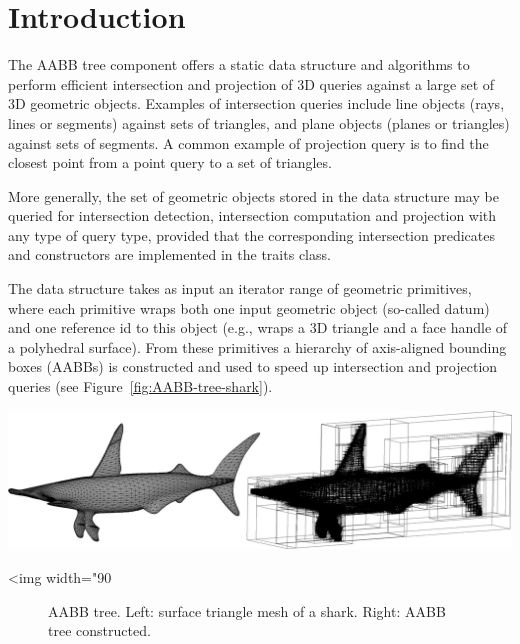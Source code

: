 \section{Introduction}
\label{AABB_tree_section_intro}

The AABB tree component offers a static data structure and algorithms to perform efficient intersection and projection of 3D queries against a large set of 3D geometric objects. Examples of intersection queries include line objects (rays, lines or segments) against sets of triangles, and plane objects (planes or triangles) against sets of segments. A common example of projection query is to find the closest point from a point query to a set of triangles.

More generally, the set of geometric objects stored in the data structure may be queried for intersection detection, intersection computation and projection with any type of query type, provided that the corresponding intersection predicates and constructors are implemented in the traits class. 

The data structure takes as input an iterator range of geometric primitives, where each primitive wraps both one input geometric object (so-called datum) and one reference id to this object (e.g., wraps a 3D triangle and a face handle of a polyhedral surface). From these primitives a hierarchy of axis-aligned bounding boxes (AABBs) is constructed and used to speed up intersection and projection queries (see Figure~\ref{fig:AABB-tree-shark}). 

\begin{center}
    \label{fig:AABB-tree-shark}
    \begin{ccTexOnly}
      \includegraphics[width=1.0\textwidth]{AABB_tree/shark}
    \end{ccTexOnly}
    \begin{ccHtmlOnly}
        <img width="90%
    \end{ccHtmlOnly}
    \begin{figure}[h]
        \caption{AABB tree.
                 Left: surface triangle mesh of a shark.
                 Right: AABB tree constructed.}
    \end{figure}
\end{center}

